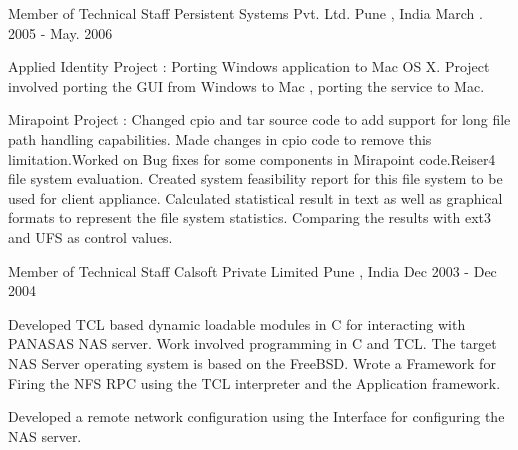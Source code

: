 \begin{cventries}
  \cventry
    {Member of Technical Staff}
    {Persistent Systems Pvt. Ltd.}
    {Pune , India}
    {March . 2005 - May. 2006}      
    {
      \begin{cvitems}
        \item Applied Identity Project : Porting Windows application to Mac OS X. Project involved porting the GUI from Windows to Mac , porting the service to Mac.
        \item Mirapoint Project : Changed cpio and tar source code to add support for long file path handling capabilities. Made changes in cpio code to remove this limitation.Worked on Bug fixes for some components in Mirapoint code.Reiser4 file system evaluation. Created system feasibility report for this file system to be used for client appliance. Calculated statistical result in text as well as graphical formats to represent the file system statistics. Comparing the results with ext3 and UFS as control values.
      \end{cvitems}
    }

  \cventry
    {Member of Technical Staff}
    {Calsoft Private Limited}
    {Pune , India}
    {Dec 2003 - Dec 2004}
    {
      \begin{cvitems} %
        \item Developed TCL based dynamic loadable modules in C for interacting with PANASAS NAS server. Work involved programming in C and TCL. The target NAS Server operating system is based on the FreeBSD. Wrote a Framework for Firing the NFS RPC using the TCL interpreter and the Application framework.
        \item Developed a remote network configuration using the  Interface for configuring the NAS server.
      \end{cvitems}
    }
\end{cventries}
